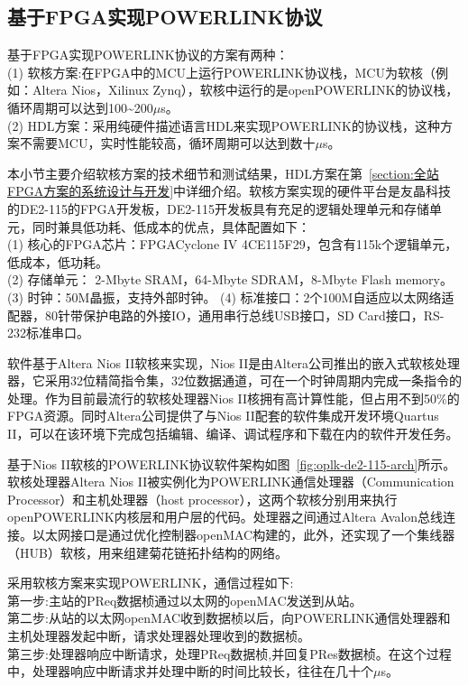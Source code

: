 \subsection{基于FPGA实现POWERLINK协议}
\label{subsection:基于FPGA实现POWERLINK协议}

基于FPGA实现POWERLINK协议的方案有两种\cite{xiao}：\\
(1) 软核方案:在FPGA中的MCU上运行POWERLINK协议栈，MCU为软核（例如：Altera Nios，Xilinux Zynq），软核中运行的是openPOWERLINK的协议栈，循环周期可以达到100\~{}200$\mu$s。\\
(2) HDL方案：采用纯硬件描述语言HDL来实现POWERLINK的协议栈，这种方案不需要MCU，实时性能较高，循环周期可以达到数十$\mu$s。

本小节主要介绍软核方案的技术细节和测试结果，HDL方案在第~\ref{section:全站FPGA方案的系统设计与开发}中详细介绍。软核方案实现的硬件平台是友晶科技的DE2-115的FPGA开发板，DE2-115开发板具有充足的逻辑处理单元和存储单元，同时兼具低功耗、低成本的优点，具体配置如下：\\
(1) 核心的FPGA芯片：FPGACyclone IV 4CE115F29，包含有115k个逻辑单元，低成本，低功耗。\\
(2) 存储单元： 2-Mbyte SRAM，64-Mbyte SDRAM，8-Mbyte Flash memory。
(3) 时钟：50M晶振，支持外部时钟。
(4) 标准接口：2个100M自适应以太网络适配器，80针带保护电路的外接IO，通用串行总线USB接口，SD Card接口，RS-232标准串口。

软件基于Altera Nios II软核来实现，Nios II是由Altera公司推出的嵌入式软核处理器，它采用32位精简指令集，32位数据通道，可在一个时钟周期内完成一条指令的处理。作为目前最流行的软核处理器Nios II核拥有高计算性能，但占用不到50\%的FPGA资源。同时Altera公司提供了与Nios II配套的软件集成开发环境Quartus II，可以在该环境下完成包括编辑、编译、调试程序和下载在内的软件开发任务。

基于Nios II软核的POWERLINK协议软件架构如图~\ref{fig:oplk-de2-115-arch}所示。软核处理器Altera Nios II被实例化为POWERLINK通信处理器（Communication Processor）和主机处理器（host processor），这两个软核分别用来执行openPOWERLINK内核层和用户层的代码。处理器之间通过Altera Avalon总线连接。以太网接口是通过优化控制器openMAC构建的，此外，还实现了一个集线器（HUB）软核，用来组建菊花链拓扑结构的网络。

采用软核方案来实现POWERLINK，通信过程如下:\\
第一步:主站的PReq数据桢通过以太网的openMAC发送到从站。\\
第二步:从站的以太网openMAC收到数据桢以后，向POWERLINK通信处理器和主机处理器发起中断，请求处理器处理收到的数据桢。\\
第三步:处理器响应中断请求，处理PReq数据桢,并回复PRes数据桢。在这个过程中，处理器响应中断请求并处理中断的时间比较长，往往在几十个$\mu$s。

